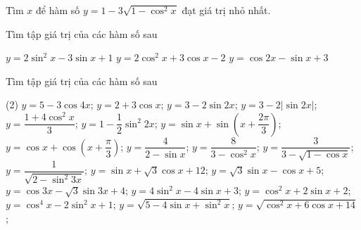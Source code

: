 \begin{vd}
	Tìm $x$ để hàm số $y=1-3\sqrt{1-{{\cos}^2}x}$ đạt giá trị nhỏ nhất.
\end{vd}

\begin{vd}
	Tìm tập giá trị của các hàm số sau
	\begin{tasks}
		\task $y=2{{\sin}^2}x-3\sin x+1$
		\task $y=2{{\cos}^2}x+3\cos x-2$
		\task  $y=\cos 2x-\sin x+3$
	\end{tasks}
\end{vd} 
\setcounter{bt}{0}%
\baitaptl
\begin{bt}
	Tìm tập giá trị của các hàm số sau
	\begin{tasks}(2)
		\task $y=5-3\cos 4x$;
		\task $y=2+3\cos x$;
		\task $y=3-2\sin 2x$;
		\task $y=3-2|\sin 2x|$;
		\task $y=\dfrac{1+4\cos^{2}x}{3}$;
		\task $y=1-\dfrac{1}{2}\sin^{2}2x$;
		\task $y=\sin x+\sin (x+\dfrac{2\pi}{3})$;
		\task $y=\cos x+\cos (x+\dfrac{\pi}{3})$;
		\task $y=\dfrac{4}{2-\sin x}$;
		\task $y=\dfrac{8}{3-\cos ^{2} x}$;
		\task $y=\dfrac{3}{3-\sqrt{1-\cos x}}$;
		\task $y=\dfrac{1}{\sqrt{2-\sin ^{2} 3 x}}$;
		\task $y=\sin x+\sqrt{3} \cos x+12$;
		\task $y=\sqrt{3} \sin x-\cos x+5$;
		\task $y=\cos 3x-\sqrt{3} \sin 3x+4$;
		\task $y=4 \sin ^{2} x-4 \sin x+3$;
		\task $y=\cos ^{2} x+2 \sin x+2$;
		\task $y=\cos ^{4} x-2 \sin ^{2} x+1$;
		\task $y=\sqrt{5-4 \sin x+\sin ^{2} x}$;
		\task $y=\sqrt{\cos ^{2} x+6 \cos x+14}$;
	\end{tasks}
\end{bt}
